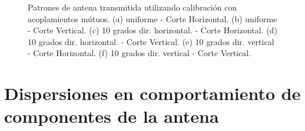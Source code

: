 \begin{figure}[H]
		\caption{Patrones de antena transmitida utilizando calibración con acoplamientos mútuos. (a) uniforme - Corte Horizontal.
			(b) uniforme - Corte Vertical. (c) 10 grados dir. horizontal. - Corte Horizontal. (d) 10 grados dir. horizontal. - Corte 
			Vertical. (e) 10 grados dir. vertical - Corte Horizontal. (f) 10 grados dir. vertical - Corte Vertical.}
	\label{fig:deadTRMsMutualPat}
\end{figure}


\section{Dispersiones en comportamiento de componentes de la antena}

